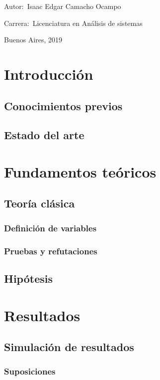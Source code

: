 \documentclass[12pt]{book}
\begin{document}
\noindent Autor:\,	Isaac Edgar Camacho Ocampo
 
\noindent Carrera:\,	Licenciatura en An\'alisis de sistemas

\vspace{1cm}

\vspace{1cm}

\noindent Buenos Aires, 2019

\newpage


\tableofcontents

\tableofcontents
\chapter{Introducción}
\section{Conocimientos previos}
\section{Estado del arte}
\chapter{Fundamentos teóricos}
\section{Teoría clásica}
\subsection{Definición de variables}
\subsection{Pruebas y refutaciones}
\section{Hipótesis}
\chapter{Resultados}
\section{Simulación de resultados}
\subsection{Suposiciones}
\end{document}
